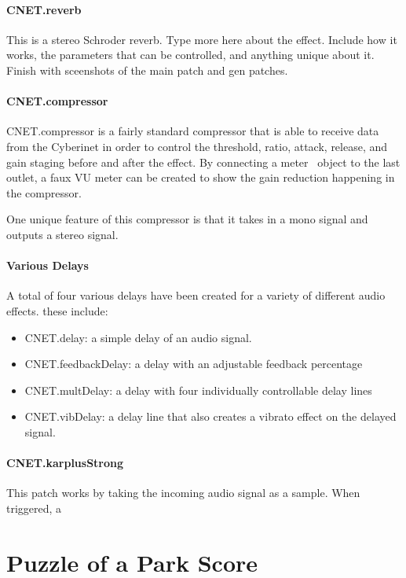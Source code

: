 \subsubsection{CNET.reverb}
This is a stereo Schroder reverb. Type more here about the effect. Include how it works, the parameters that can be controlled, and anything unique about it. Finish with sceenshots of the main patch and gen patches.

\subsubsection{CNET.compressor}
CNET.compressor is a fairly standard compressor that is able to receive data from the Cyberinet in order to control the threshold, ratio, attack, release, and gain staging before and after the effect. By connecting a meter~ object to the last outlet, a faux VU meter can be created to show the gain reduction happening in the compressor.

One unique feature of this compressor is that it takes in a mono signal and outputs a stereo signal.

\subsubsection{Various Delays}
A total of four various delays have been created for a variety of different audio effects. these include:

\begin{itemize}
    \item CNET.delay: a simple delay of an audio signal.
    \item CNET.feedbackDelay: a delay with an adjustable feedback percentage
    \item CNET.multDelay: a delay with four individually controllable delay lines
    \item CNET.vibDelay: a delay line that also creates a vibrato effect on the delayed signal.
\end{itemize}

\subsubsection{CNET.karplusStrong}
This patch works by taking the incoming audio signal as a sample. When triggered, a 


\chapter{Puzzle of a Park Score}

